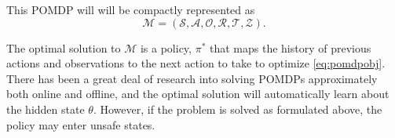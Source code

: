 \documentclass{article}
\newcommand{\sspace}{\ensuremath{\mathcal{S}} }
\newcommand{\aspace}{\ensuremath{\mathcal{A}} }
\newcommand{\ospace}{\ensuremath{\mathcal{O}} }
\newcommand{\tdist}{\ensuremath{\mathcal{T}} }
\newcommand{\odist}{\ensuremath{\mathcal{Z}} }
\newcommand{\reward}{\ensuremath{\mathcal{R}} }
\begin{document}
This POMDP will will be compactly represented as
\begin{equation}
    \mathcal{M} = (\sspace, \aspace, \ospace, \reward, \tdist, \odist) \text{.}
\end{equation}

The optimal solution to $\mathcal{M}$ is a policy, $\pi^*$ that maps the history of previous actions and observations to the next action to take to optimize \cref{eq:pomdpobj}.
There has been a great deal of research into solving POMDPs approximately both online and offline, and the optimal solution will automatically learn about the hidden state $\theta$. However, if the problem is solved as formulated above, the policy may enter unsafe states.

% 
% 
% 
% 
% 
% 
% 
% 
\end{document}
